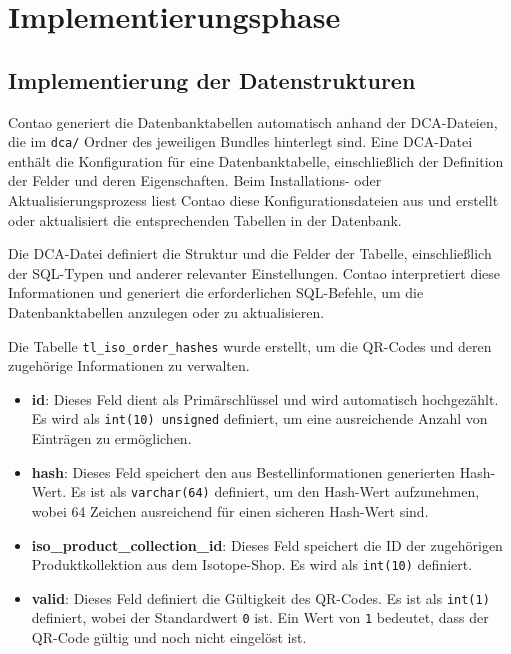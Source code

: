 \section{Implementierungsphase} 
\label{sec:Implementierungsphase}

\subsection{Implementierung der Datenstrukturen}
\label{sec:ImplementierungDatenstrukturen}

Contao generiert die Datenbanktabellen automatisch anhand der DCA-Dateien, die im \texttt{dca/} Ordner des jeweiligen Bundles hinterlegt sind. Eine DCA-Datei enthält die Konfiguration für eine Datenbanktabelle, einschließlich der Definition der Felder und deren Eigenschaften. Beim Installations- oder Aktualisierungsprozess liest Contao diese Konfigurationsdateien aus und erstellt oder aktualisiert die entsprechenden Tabellen in der Datenbank.

Die DCA-Datei definiert die Struktur und die Felder der Tabelle, einschließlich der SQL-Typen und anderer relevanter Einstellungen. Contao interpretiert diese Informationen und generiert die erforderlichen SQL-Befehle, um die Datenbanktabellen anzulegen oder zu aktualisieren.

Die Tabelle \texttt{tl\_iso\_order\_hashes} wurde erstellt, um die QR-Codes und deren zugehörige Informationen zu verwalten.

\begin{itemize}
    \item \textbf{id}: Dieses Feld dient als Primärschlüssel und wird automatisch hochgezählt. Es wird als \texttt{int(10) unsigned} definiert, um eine ausreichende Anzahl von Einträgen zu ermöglichen.
    \item \textbf{hash}: Dieses Feld speichert den aus Bestellinformationen generierten Hash-Wert. Es ist als \texttt{varchar(64)} definiert, um den Hash-Wert aufzunehmen, wobei 64 Zeichen ausreichend für einen sicheren Hash-Wert sind.
    \item \textbf{iso\_product\_collection\_id}: Dieses Feld speichert die ID der zugehörigen Produktkollektion aus dem Isotope-Shop. Es wird als \texttt{int(10)} definiert.
    \item \textbf{valid}: Dieses Feld definiert die Gültigkeit des QR-Codes. Es ist als \texttt{int(1)} definiert, wobei der Standardwert \texttt{0} ist. Ein Wert von \texttt{1} bedeutet, dass der QR-Code gültig und noch nicht eingelöst ist.
\end{itemize}

